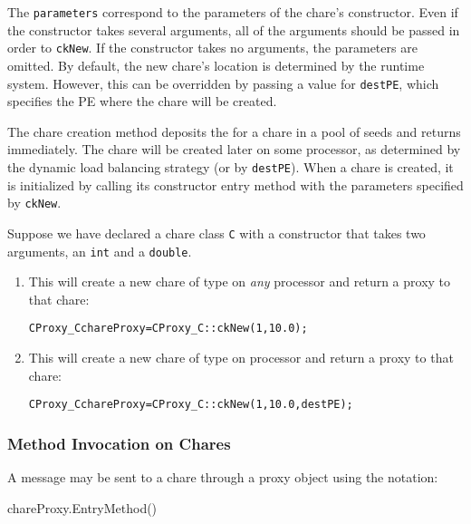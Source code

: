 The {\tt parameters} correspond to the parameters of the chare's constructor.
Even if the constructor takes several arguments, all of the arguments should be
passed in order to {\tt ckNew}. If the constructor takes no arguments, the
parameters are omitted. By default, the new chare's location is determined by
the runtime system. However, this can be overridden by passing a value for
{\tt destPE}, which specifies the PE where the chare will be created.

The chare creation method deposits the  for
a chare in a pool of seeds and returns immediately. The chare will
be created later on some processor, as determined by the dynamic load balancing strategy (or by {\tt destPE}).
When a chare is created, it is
initialized by calling its constructor entry method with the parameters specified by {\tt ckNew}.

Suppose we have declared a chare class {\tt C} with a constructor that takes two
arguments, an {\tt int} and a {\tt double}.

\begin{enumerate}
\item{This will create a new chare of type  on {\em any}
processor and return a proxy to that chare:}

\begin{alltt}
   CProxy_C chareProxy = CProxy_C::ckNew(1, 10.0);
\end{alltt} 

\item{This will create a new chare of type  on processor
 and return a proxy to that chare:}

\begin{alltt}
   CProxy_C chareProxy = CProxy_C::ckNew(1, 10.0, destPE);
\end{alltt}

\end{enumerate}

\subsubsection{Method Invocation on Chares}

A message  may be sent to a chare through a proxy
object using the notation:

\begin{tabbing}
chareProxy.EntryMethod()
\end{tabbing}

